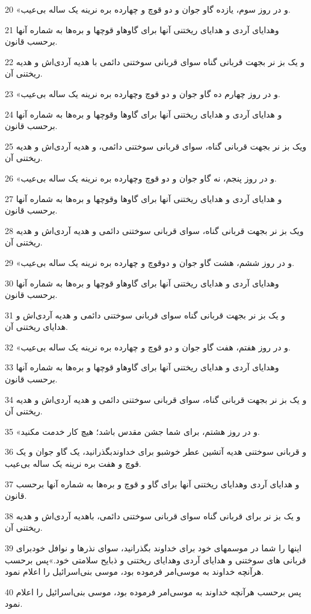 \par 20 «و در روز سوم، یازده گاو جوان و دو قوچ و چهارده بره نرینه یک ساله بی‌عیب.
\par 21 وهدایای آردی و هدایای ریختنی آنها برای گاوهاو قوچها و بره‌ها به شماره آنها برحسب قانون.
\par 22 و یک بز نر بجهت قربانی گناه سوای قربانی سوختنی دائمی با هدیه آردی‌اش و هدیه ریختنی آن.
\par 23 «و در روز چهارم ده گاو جوان و دو قوچ وچهارده بره نرینه یک ساله بی‌عیب.
\par 24 و هدایای آردی و هدایای ریختنی آنها برای گاوها وقوچها و بره‌ها به شماره آنها برحسب قانون.
\par 25 ویک بز نر بجهت قربانی گناه، سوای قربانی سوختنی دائمی، و هدیه آردی‌اش و هدیه ریختنی آن.
\par 26 «و در روز پنجم، نه گاو جوان و دو قوچ وچهارده بره نرینه یک ساله بی‌عیب.
\par 27 و هدایای آردی و هدایای ریختنی آنها برای گاوها وقوچها و بره‌ها به شماره آنها برحسب قانون.
\par 28 ویک بز نر بجهت قربانی گناه، سوای قربانی سوختنی دائمی و هدیه آردی‌اش و هدیه ریختنی آن.
\par 29 «و در روز ششم، هشت گاو جوان و دوقوچ و چهارده بره نرینه یک ساله بی‌عیب.
\par 30 وهدایای آردی و هدایای ریختنی آنها برای گاوهاو قوچها و بره‌ها به شماره آنها برحسب قانون.
\par 31 و یک بز نر بجهت قربانی گناه سوای قربانی سوختنی دائمی و هدیه آردی‌اش و هدایای ریختنی آن.
\par 32 «و در روز هفتم، هفت گاو جوان و دو قوچ و چهارده بره نرینه یک ساله بی‌عیب.
\par 33 وهدایای آردی و هدایای ریختنی آنها برای گاوهاو قوچها و بره‌ها به شماره آنها برحسب قانون.
\par 34 و یک بز نر بجهت قربانی گناه، سوای قربانی سوختنی دائمی و هدیه آردی‌اش و هدیه ریختنی آن.
\par 35 «و در روز هشتم، برای شما جشن مقدس باشد؛ هیچ کار خدمت مکنید.
\par 36 و قربانی سوختنی هدیه آتشین عطر خوشبو برای خداوندبگذرانید، یک گاو جوان و یک قوچ و هفت بره نرینه یک ساله بی‌عیب.
\par 37 و هدایای آردی وهدایای ریختنی آنها برای گاو و قوچ و بره‌ها به شماره آنها برحسب قانون.
\par 38 و یک بز نر برای قربانی گناه سوای قربانی سوختنی دائمی، باهدیه آردی‌اش و هدیه ریختنی آن.
\par 39 اینها را شما در موسمهای خود برای خداوند بگذرانید، سوای نذرها و نوافل خودبرای قربانی های سوختنی و هدایای آردی وهدایای ریختنی و ذبایح سلامتی خود.»پس برحسب هر‌آنچه خداوند به موسی‌امر فرموده بود، موسی بنی‌اسرائیل را اعلام نمود.
\par 40 پس برحسب هر‌آنچه خداوند به موسی‌امر فرموده بود، موسی بنی‌اسرائیل را اعلام نمود.
 
